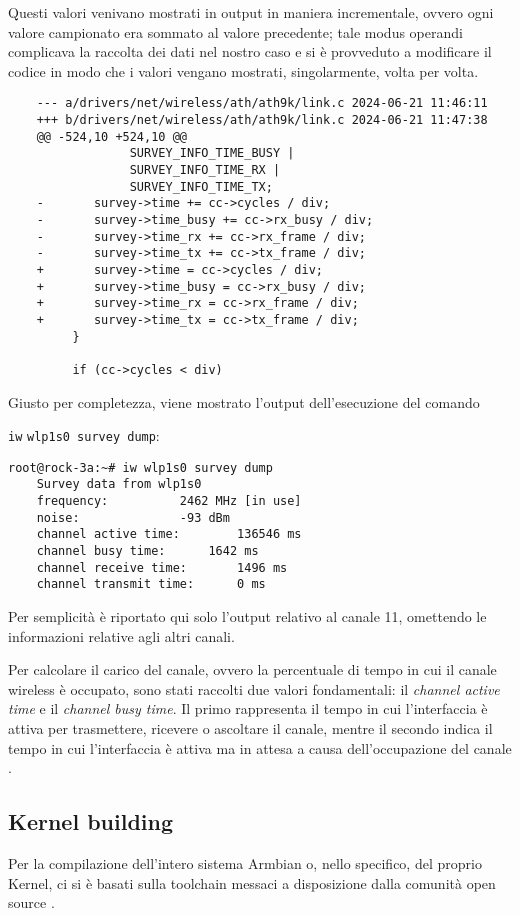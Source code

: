 Questi valori venivano mostrati in output in maniera incrementale, ovvero ogni valore campionato era sommato al valore precedente; tale modus operandi complicava la raccolta dei dati nel nostro caso e si è provveduto a modificare il codice in modo che i valori vengano mostrati, singolarmente, volta per volta.
\begin{lstlisting}
    --- a/drivers/net/wireless/ath/ath9k/link.c	2024-06-21 11:46:11
    +++ b/drivers/net/wireless/ath/ath9k/link.c	2024-06-21 11:47:38
    @@ -524,10 +524,10 @@
                 SURVEY_INFO_TIME_BUSY |
                 SURVEY_INFO_TIME_RX |
                 SURVEY_INFO_TIME_TX;
    -		survey->time += cc->cycles / div;
    -		survey->time_busy += cc->rx_busy / div;
    -		survey->time_rx += cc->rx_frame / div;
    -		survey->time_tx += cc->tx_frame / div;
    +		survey->time = cc->cycles / div;
    +		survey->time_busy = cc->rx_busy / div;
    +		survey->time_rx = cc->rx_frame / div;
    +		survey->time_tx = cc->tx_frame / div;
         }
     
         if (cc->cycles < div)
\end{lstlisting}
Giusto per completezza, viene mostrato l'output dell'esecuzione del comando 

\verb|iw| \verb|wlp1s0 survey dump|:
\begin{lstlisting}
root@rock-3a:~# iw wlp1s0 survey dump
    Survey data from wlp1s0
	frequency:			2462 MHz [in use]
	noise:				-93 dBm
	channel active time:		136546 ms
	channel busy time:		1642 ms
	channel receive time:		1496 ms
	channel transmit time:		0 ms
\end{lstlisting}
Per semplicità è riportato qui solo l'output relativo al canale 11, omettendo le informazioni relative agli altri canali.

Per calcolare il carico del canale, ovvero la percentuale di tempo in cui il canale wireless è occupato, sono stati raccolti due valori fondamentali: il \textit{channel active time} e il \textit{channel busy time}. Il primo rappresenta il tempo in cui l'interfaccia è attiva per trasmettere, ricevere o ascoltare il canale, mentre il secondo indica il tempo in cui l'interfaccia è attiva ma in attesa a causa dell'occupazione del canale \cite{han2016adaptive}.

\subsection[Kernel building]{Kernel building}
Per la compilazione dell'intero sistema Armbian o, nello specifico, del proprio Kernel, ci si è basati sulla toolchain messaci a disposizione dalla comunità open source \cite{armbian_tool}. 

